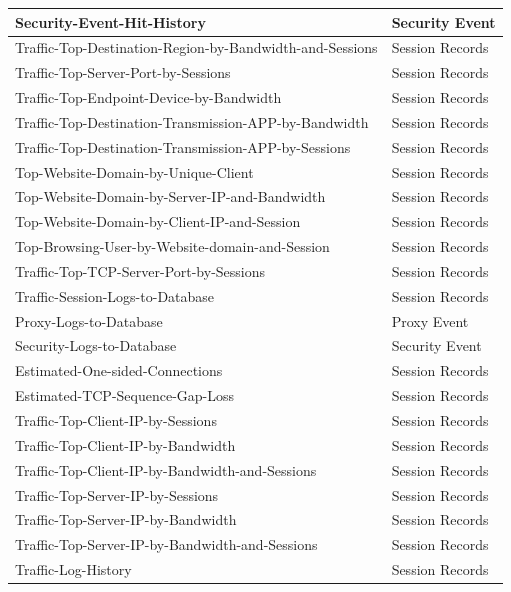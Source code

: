 \begin{longtable}{p{}|p{}}
    Security-Event-Hit-History	& Security Event \\\hline 
    Traffic-Top-Destination-Region-by-Bandwidth-and-Sessions	& Session Records \\\hline 
    Traffic-Top-Server-Port-by-Sessions	& Session Records \\\hline 
    Traffic-Top-Endpoint-Device-by-Bandwidth	& Session Records \\\hline 
    Traffic-Top-Destination-Transmission-APP-by-Bandwidth	& Session Records \\\hline 
    Traffic-Top-Destination-Transmission-APP-by-Sessions	& Session Records \\\hline 
    Top-Website-Domain-by-Unique-Client	& Session Records \\\hline 
    Top-Website-Domain-by-Server-IP-and-Bandwidth	& Session Records \\\hline 
    Top-Website-Domain-by-Client-IP-and-Session	& Session Records \\\hline 
    Top-Browsing-User-by-Website-domain-and-Session	& Session Records \\\hline 
    Traffic-Top-TCP-Server-Port-by-Sessions	& Session Records \\\hline 
    Traffic-Session-Logs-to-Database	& Session Records \\\hline 
    Proxy-Logs-to-Database	& Proxy Event \\\hline 
    Security-Logs-to-Database	& Security Event \\\hline 
    Estimated-One-sided-Connections	& Session Records \\\hline 
    Estimated-TCP-Sequence-Gap-Loss	& Session Records \\\hline 
    Traffic-Top-Client-IP-by-Sessions	& Session Records \\\hline 
    Traffic-Top-Client-IP-by-Bandwidth	& Session Records \\\hline 
    Traffic-Top-Client-IP-by-Bandwidth-and-Sessions	& Session Records \\\hline 
    Traffic-Top-Server-IP-by-Sessions	& Session Records \\\hline 
    Traffic-Top-Server-IP-by-Bandwidth	& Session Records \\\hline 
    Traffic-Top-Server-IP-by-Bandwidth-and-Sessions	& Session Records \\\hline 
    Traffic-Log-History	& Session Records \\\hline 
\end{longtable} 
